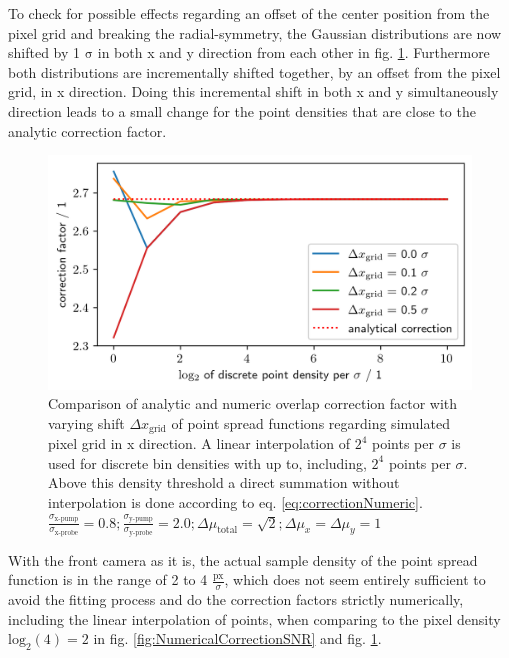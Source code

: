 \documentclass[twoside,openright,listof=numbered]{scrreprt}
\begin{document}
To check for possible effects regarding an offset of the center position from the pixel grid and breaking the radial-symmetry, the Gaussian distributions are now shifted by 1 $\mathrm{\sigma}$ in both x and y direction from each other in fig. \ref{fig:NumericalCorrectionShift}. Furthermore both distributions are incrementally shifted together, by an offset from the pixel grid, in x direction. Doing this incremental shift in both x and y simultaneously direction leads to a small change for the point densities that are close to the analytic correction factor. 

\begin{figure}[h]
\centering
\includegraphics[width=0.9\linewidth]{images/NumericalCorrectionShiftedBeams_interpolation.png}
\caption[Comparison of analytic and numeric overlap correction factor with varying shift of point spread functions regarding simulated pixel grid in x direction.]{Comparison of analytic and numeric overlap correction factor with varying shift $\Delta x_\text{grid}$ of point spread functions regarding simulated pixel grid in x direction. A linear interpolation of $2^4$ points per $\sigma$ is used for discrete bin densities with up to, including, $2^4$ points per $\sigma$. Above this density threshold a direct summation without interpolation is done according to eq. \ref{eq:correctionNumeric}.
\\$\frac{\sigma_\text{x-pump}}{\sigma_\text{x-probe}}=0.8;\frac{\sigma_\text{y-pump}}{\sigma_\text{y-probe}}=2.0;\Delta\mu_\text{total} = \sqrt{2}; \Delta\mu_{x} = \Delta\mu_y = 1$\label{fig:NumericalCorrectionShift}}
\end{figure}

With the front camera as it is, the actual sample density of the point spread function is in the range of 2 to 4 $\frac{\text{px}}{\sigma}$, which does not seem entirely sufficient to avoid the fitting process and do the correction factors strictly numerically, including the linear interpolation of points, when comparing to the pixel density $\mathrm{log_2(4) = 2}$ in fig. \ref{fig:NumericalCorrectionSNR} and fig. \ref{fig:NumericalCorrectionShift}.
\end{document}

